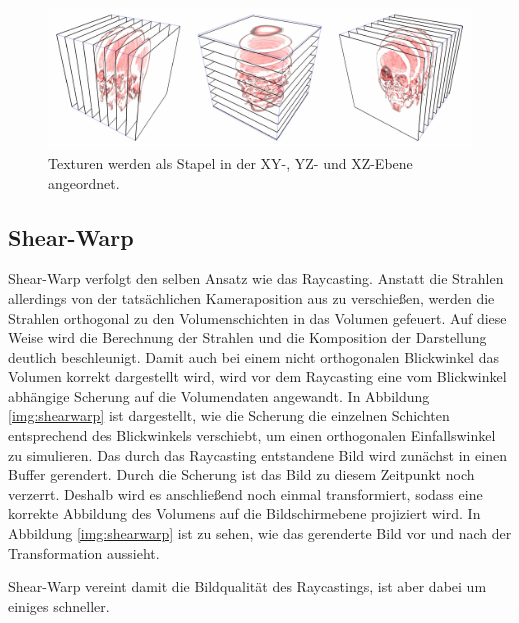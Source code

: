 

\begin{figure}[!htb]
	\centering
	\includegraphics[width=0.7\linewidth]{images/textureStacks.png}
	\caption{Texturen werden als Stapel in der 	XY-, YZ- und XZ-Ebene angeordnet.}
	\label{img:textureBased}
\end{figure}
\FloatBarrier

\subsection{Shear-Warp}

Shear-Warp verfolgt den selben Ansatz wie das Raycasting. Anstatt die Strahlen allerdings von der tatsächlichen Kameraposition aus zu verschießen, werden die Strahlen orthogonal zu den Volumenschichten in das Volumen gefeuert. Auf diese Weise wird die Berechnung der Strahlen und die Komposition der Darstellung deutlich beschleunigt. 
Damit auch bei einem nicht orthogonalen Blickwinkel das Volumen korrekt dargestellt wird, wird vor dem Raycasting eine vom Blickwinkel abhängige Scherung auf die Volumendaten angewandt. In Abbildung \ref{img:shearwarp} ist dargestellt, wie die Scherung die einzelnen Schichten entsprechend des Blickwinkels verschiebt, um einen orthogonalen Einfallswinkel zu simulieren. 
Das durch das Raycasting entstandene Bild wird zunächst in einen Buffer gerendert. Durch die Scherung ist das Bild zu diesem Zeitpunkt noch verzerrt. Deshalb wird es anschließend noch einmal transformiert, sodass eine korrekte Abbildung des Volumens auf die Bildschirmebene projiziert wird. In Abbildung \ref{img:shearwarp} ist zu sehen, wie das gerenderte Bild vor und nach der Transformation aussieht. 

Shear-Warp vereint damit die Bildqualität des Raycastings, ist aber dabei um einiges schneller.

